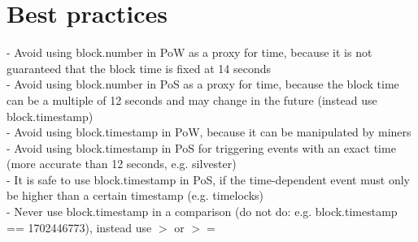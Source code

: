 \section{Best practices}
- Avoid using block.number in PoW as a proxy for time, because it is not guaranteed that the block time is fixed at 14 seconds \\
- Avoid using block.number in PoS as a proxy for time, because the block time can be a multiple of 12 seconds and may change in the future (instead use block.timestamp)\\
- Avoid using block.timestamp in PoW, because it can be manipulated by miners \\
- Avoid using block.timestamp in PoS for triggering events with an exact time (more accurate than 12 seconds, e.g. silvester) \\
- It is safe to use block.timestamp in PoS, if the time-dependent event must only be higher than a certain timestamp (e.g. timelocks) \\
- Never use block.timestamp in a comparison (do not do: e.g. block.timestamp == 1702446773), instead use $>$ or $>=$


